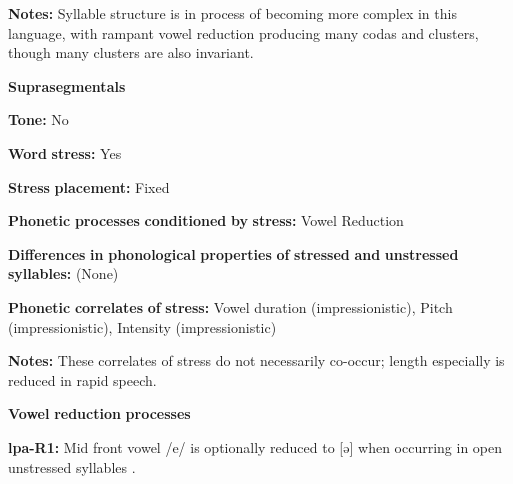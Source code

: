 \documentclass[output=paper]{langsci/langscibook}
\begin{document}
\begin{styleBody}
\textbf{Notes:} Syllable structure is in process of becoming more complex in this language, with rampant vowel reduction producing many codas and clusters, though many clusters are also invariant.
\end{styleBody}

\begin{styleBody}
\textbf{Suprasegmentals}
\end{styleBody}

\begin{styleBody}
\textbf{Tone:} No
\end{styleBody}

\begin{styleBody}
\textbf{Word} \textbf{stress:} Yes
\end{styleBody}

\begin{styleBody}
\textbf{Stress} \textbf{placement:} Fixed
\end{styleBody}

\begin{styleBody}
\textbf{Phonetic} \textbf{processes} \textbf{conditioned} \textbf{by} \textbf{stress:} Vowel Reduction
\end{styleBody}

\begin{styleBody}
\textbf{Differences} \textbf{in} \textbf{phonological} \textbf{properties} \textbf{of} \textbf{stressed} \textbf{and} \textbf{unstressed} \textbf{syllables:} (None)
\end{styleBody}

\begin{styleBody}
\textbf{Phonetic} \textbf{correlates} \textbf{of} \textbf{stress:} Vowel duration (impressionistic), Pitch (impressionistic), Intensity (impressionistic)
\end{styleBody}

\begin{styleBody}
\textbf{Notes:} These correlates of stress do not necessarily co-occur; length especially is reduced in rapid speech.
\end{styleBody}

\begin{styleBody}
\textbf{Vowel} \textbf{reduction} \textbf{processes}
\end{styleBody}

\begin{styleBody}
\textbf{lpa-R1:} Mid front vowel /e/ is optionally reduced to [ə] when occurring in open unstressed syllables \citep[34]{Lacrampe2014}.
\end{styleBody}
\end{document}
